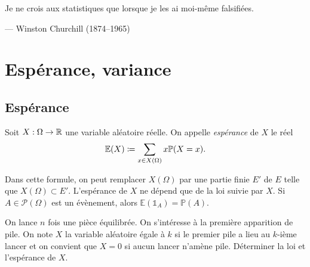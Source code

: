 \documentclass{magnolia}
\begin{document}
% 


\setlength{}
\epigraph{\og Je ne crois aux statistiques que lorsque je les ai moi-même falsifiées. \fg}{--- {\sc Winston Churchill (1874--1965)}}

\magtoc




\section{Espérance, variance}

\subsection{Espérance}

\begin{definition}
Soit $X:\Omega\to\mathbb{R}$ une variable aléatoire réelle. On appelle \emph{espérance} de $X$ le
réel
\[\mathbb{E}(X)\coloneqq\sum_{x\in X(\Omega)} x \mathbb{P}(X=x).\] 
\end{definition}

\begin{remarques}
\remarque Dans cette formule, on peut remplacer $X(\Omega)$ par une partie finie $E'$ de $E$ telle que
  $X(\Omega)\subset E'$. 
\remarque L'espérance de $X$ ne dépend que de la loi suivie par $X$.
\remarque Si $A\in\mathcal{P}(\Omega)$ est un évènement, alors
  $\mathbb{E}(\mathds{1}_A)=\mathbb{P}(A).$
\end{remarques}

\begin{exoUnique}
\exo On lance $n$ fois une pièce équilibrée. On s'intéresse à la première apparition de
  pile. On note $X$ la variable aléatoire égale à $k$ si le premier pile a lieu au $k$-ième
  lancer et on convient que $X=0$ si aucun lancer n'amène pile. Déterminer la loi et
  l'espérance de $X$.
\end{exoUnique}
\end{document}
